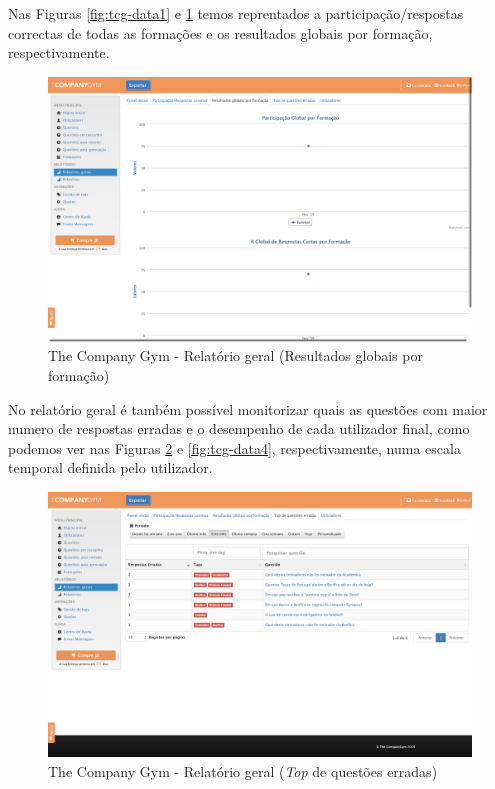 Nas Figuras \ref{fig:tcg-data1} e \ref{fig:tcg-data2} temos reprentados a participação/respostas correctas de todas as formações e os resultados globais por formação, respectivamente.

\begin{figure}[ht!]
	\begin{center}
		\includegraphics[width=1\textwidth]{img/tcg/tcg-data2.png}
		\caption{The Company Gym - Relatório geral (Resultados globais por formação)}
		\label{fig:tcg-data2}
	\end{center}
\end{figure}

\newpage


No relatório geral é também possível monitorizar quais as questões com maior numero de respostas erradas e o desempenho de cada utilizador final, como podemos ver nas Figuras \ref{fig:tcg-data3} e \ref{fig:tcg-data4}, respectivamente, numa escala temporal definida pelo utilizador. 

\begin{figure}[ht!]
	\begin{center}
		\includegraphics[width=1\textwidth]{img/tcg/tcg-data3.png}
		\caption{The Company Gym - Relatório geral (\textit{Top} de questões erradas)}
		\label{fig:tcg-data3}
	\end{center}
\end{figure}

